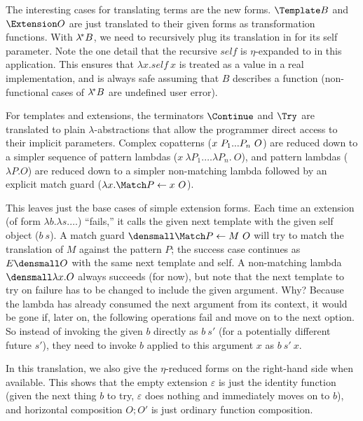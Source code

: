 The interesting cases for translating terms are the new forms.
$\Template B$ and $\Extension O$ are just translated to their given forms as transformation functions.
With $\lambda^{\!*} B$, we need to recursively plug its translation in for its self parameter.
Note the one detail that the recursive $\mathit{self}$ is $\eta$-expanded to in this application.
This ensures that $\lambda x. \mathit{self} ~ x$ is treated as a value in a real implementation, and is always safe assuming that $B$ describes a function (non-functional cases of $\lambda^{\!*} B$ are undefined user error).

For templates and extensions, the terminators $\Continue$ and $\Try$ are translated to plain $\lambda$-abstractions that allow the programmer direct access to their implicit parameters.
Complex copatterns ($x ~ P_1\overset{{}_{}}{...} P_n ~ O$) are reduced down to a simpler sequence of pattern lambdas ($x ~ \lambda P_1. \dots \lambda P_n. ~ O$), and pattern lambdas ($\lambda P. O$) are reduced down to a simpler non-matching lambda followed by an explicit match guard ($\lambda x. \Match P \gets x ~ O$).

This leaves just the base cases of simple extension forms.
Each time an extension (of form $\lambda b. \lambda s. \dots$) ``fails,'' it calls the given next template with the given self object ($b~s$).
A match guard $\den{\Match P \gets M ~ O}$ will try to match the translation of $M$ against the pattern $P$; the success case continues as $E\den{O}$ with the same next template and self.
A non-matching lambda $\den{\lambda x. O}$ always succeeds (for now), but note that the next template to try on failure has to be changed to include the given argument.
Why?
Because the lambda has already consumed the next argument from its context, it would be gone if, later on, the following operations fail and move on to the next option.
So instead of invoking the given $b$ directly as $b~s'$ (for a potentially different future $s'$), they need to invoke $b$ applied to this argument $x$ as $b~s'~x$.

In this translation, we also give the $\eta$-reduced forms on the right-hand side when available.
This shows that the empty extension $\varepsilon$ is just the identity function (given the next thing $b$ to try, $\varepsilon$ does nothing and immediately moves on to $b$), and horizontal composition $O; O'$ is just ordinary function composition.



